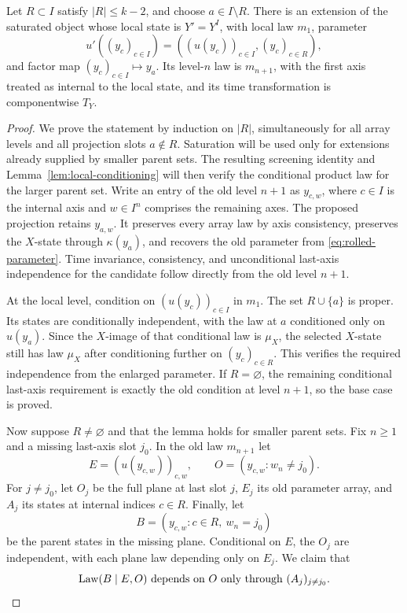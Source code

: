 \begin{lemma}\label{lem:rolled-extension}
Let $R\subset I$ satisfy $|R|\leq k-2$, and choose $a\in I\setminus R$.
There is an extension of the saturated object whose local state is
$Y'=Y^I$, with local law $m_1$, parameter
\begin{equation}\label{eq:rolled-parameter}
 u'((y_c)_{c\in I})=((u(y_c))_{c\in I},(y_c)_{c\in R}),
\end{equation}
and factor map $(y_c)_{c\in I}\mapsto y_a$.
Its level-$n$ law is $m_{n+1}$, with the first axis treated as internal
to the local state, and its time transformation is componentwise $T_Y$.
\end{lemma}

\begin{proof}
We prove the statement by induction on $|R|$, simultaneously for all
array levels and all projection slots $a\notin R$. Saturation will be
used only for extensions already supplied by smaller parent sets.
The resulting screening identity and Lemma~\ref{lem:local-conditioning}
will then verify the conditional product law for the larger parent set.
Write an entry of
the old level $n+1$ as $y_{c,w}$, where $c\in I$ is the internal axis
and $w\in I^n$ comprises the remaining axes.  The proposed projection
retains $y_{a,w}$.  It preserves every array law by axis consistency,
preserves the $X$-state through $\kappa(y_a)$, and recovers the old
parameter from \eqref{eq:rolled-parameter}.  Time invariance,
consistency, and unconditional last-axis independence for the candidate
follow directly from the old level $n+1$.

At the local level, condition on $(u(y_c))_{c\in I}$ in $m_1$.  The set
$R\cup\{a\}$ is proper.  Its states are conditionally independent,
with the law at $a$ conditioned only on $u(y_a)$.  Since the $X$-image
of that conditional law is $\mu_X$, the selected $X$-state still has
law $\mu_X$ after conditioning further on $(y_c)_{c\in R}$.
This verifies the required independence from the enlarged parameter.
If $R=\varnothing$, the remaining conditional last-axis requirement is
exactly the old condition at level $n+1$, so the base case is proved.

Now suppose $R\ne\varnothing$ and that the lemma holds for smaller
parent sets.  Fix $n\geq1$ and a missing last-axis slot $j_0$.  In the
old law $m_{n+1}$ let
\[
 E=(u(y_{c,w}))_{c,w},\qquad
 O=(y_{c,w}:w_n\ne j_0).
\]
For $j\ne j_0$, let $O_j$ be the full plane at last slot $j$, $E_j$
its old parameter array, and $A_j$ its states at internal indices
$c\in R$.  Finally, let
\[
 B=(y_{c,w}:c\in R,\ w_n=j_0)
\]
be the parent states in the missing plane.  Conditional on $E$, the
$O_j$ are independent, with each plane law depending only on $E_j$.
We claim that
\begin{equation}\label{eq:parent-screening}
 \operatorname{Law}(B\mid E,O)
 \text{ depends on }O\text{ only through }(A_j)_{j\ne j_0}.
\end{equation}


\end{proof}
